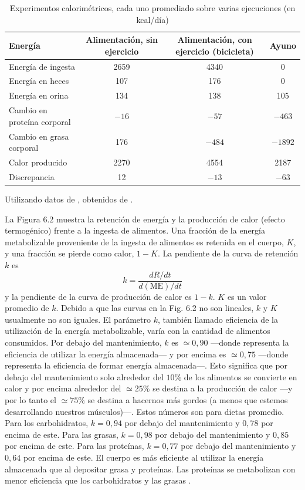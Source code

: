 \documentclass[12pt]{book}
\begin{document}
\begin{table}[htbp]
\centering
\caption{Experimentos calorimétricos, cada uno promediado sobre varias ejecuciones (en kcal/día)}
\label{tab:67}
\small
\begin{tabularx}{\textwidth}{Xccc}
\toprule
\textbf{Energía} & \textbf{Alimentación, sin ejercicio} & \textbf{Alimentación, con ejercicio (bicicleta)} & \textbf{Ayuno} \\
\midrule
Energía de ingesta & 2659 & 4340 & 0 \\
Energía en heces & 107 & 176 & 0 \\
Energía en orina & 134 & 138 & 105 \\
Cambio en proteína corporal & $-16$ & $-57$ & $-463$ \\
Cambio en grasa corporal & 176 & $-484$ & $-1892$ \\
Calor producido & 2270 & 4554 & 2187 \\
\midrule
Discrepancia & 12 & $-13$ & $-63$ \\
\bottomrule
\end{tabularx}
\begin{flushleft}
    \small Utilizando datos de \cite{11}, obtenidos de \cite{6}.
\end{flushleft}
\end{table}

La Figura 6.2 muestra la retención de energía y la producción de calor (efecto termogénico) frente a la ingesta de alimentos. Una fracción de la energía metabolizable proveniente de la ingesta de alimentos es retenida en el cuerpo, $K$, y una fracción se pierde como calor, $1 - K$. La pendiente de la curva de retención $k$ es
\begin{equation}
k = \frac{dR/dt}{d(\text{ME})/dt}
\label{eq:612}
\end{equation}
y la pendiente de la curva de producción de calor es $1 - k$. $K$ es un valor promedio de $k$. Debido a que las curvas en la Fig. 6.2 no son lineales, $k$ y $K$ usualmente no son iguales. El parámetro $k$, también llamado eficiencia de la utilización de la energía metabolizable, varía con la cantidad de alimentos consumidos. Por debajo del mantenimiento, $k$ es $\simeq 0,90$ ---donde representa la eficiencia de utilizar la energía almacenada--- y por encima es $\simeq 0,75$ ---donde representa la eficiencia de formar energía almacenada---. Esto significa que por debajo del mantenimiento solo alrededor del $10\%$ de los alimentos se convierte en calor y por encima alrededor del $\simeq 25\%$ se destina a la producción de calor ---y por lo tanto el $\simeq 75\%$ se destina a hacernos más gordos (a menos que estemos desarrollando nuestros músculos)---. Estos números son para dietas promedio. Para los carbohidratos, $k = 0,94$ por debajo del mantenimiento y $0,78$ por encima de este. Para las grasas, $k = 0,98$ por debajo del mantenimiento y $0,85$ por encima de este. Para las proteínas, $k = 0,77$ por debajo del mantenimiento y $0,64$ por encima de este. El cuerpo es más eficiente al utilizar la energía almacenada que al depositar grasa y proteínas. Las proteínas se metabolizan con menor eficiencia que los carbohidratos y las grasas \cite{11}.
\end{document}
